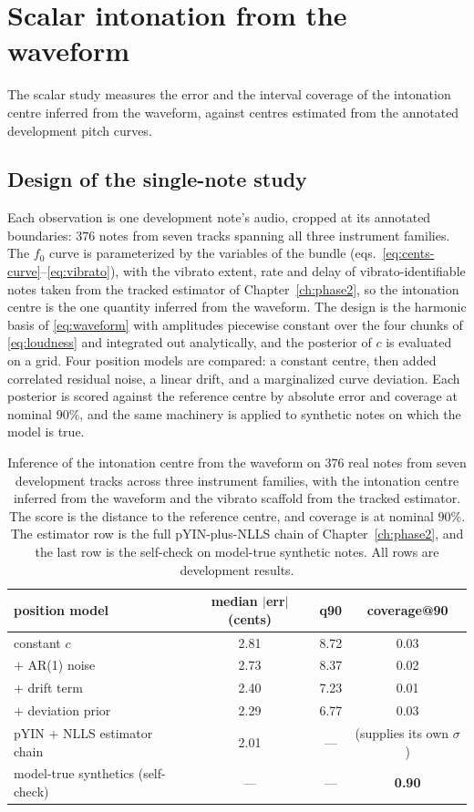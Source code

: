 \documentclass[11pt,a4paper]{report}
\begin{document}
\section{Scalar intonation from the waveform}
\label{sec:phase3-study}

The scalar study measures the error and the interval coverage of the
intonation centre inferred from the waveform, against centres estimated
from the annotated development pitch curves.

\subsection{Design of the single-note study}
Each observation is one development note's audio, cropped at its annotated
boundaries: $376$ notes from seven tracks spanning all three instrument
families. The $f_0$ curve is parameterized by the variables of the bundle
(eqs.~\eqref{eq:cents-curve}--\eqref{eq:vibrato}), with the vibrato
extent, rate and delay of vibrato-identifiable notes taken from the tracked
estimator of Chapter~\ref{ch:phase2}, so the intonation centre is the one
quantity inferred from the waveform. The design is the harmonic basis of
\eqref{eq:waveform} with amplitudes piecewise constant over the four chunks
of \eqref{eq:loudness} and integrated out analytically, and the posterior
of $c$ is evaluated on a grid. Four position models are compared: a
constant centre, then added correlated residual noise, a linear drift, and
a marginalized curve deviation. Each posterior is scored against the
reference centre by absolute error and coverage at nominal $90\%$, and the
same machinery is applied to synthetic notes on which the model is true.

\begin{table}[t]\centering
\caption{Inference of the intonation centre from the waveform on $376$ real
notes from seven development tracks across three instrument families, with
the intonation centre inferred from the waveform and the vibrato scaffold
from the tracked estimator. The score is the distance to the reference
centre, and coverage is at nominal $90\%$. The estimator row is the full
pYIN-plus-NLLS chain of Chapter~\ref{ch:phase2}, and the last row is the
self-check on model-true synthetic notes. All rows are development
results.}
\label{tab:phase3-study}
\footnotesize
\begin{tabular}{@{}lccc@{}}
\toprule
position model & median $|$err$|$ (cents) & q90 & coverage@90 \\
\midrule
constant $c$ & 2.81 & 8.72 & 0.03 \\
$+$ AR(1) noise & 2.73 & 8.37 & 0.02 \\
$+$ drift term & 2.40 & 7.23 & 0.01 \\
$+$ deviation prior & 2.29 & 6.77 & 0.03 \\
\midrule
pYIN $+$ NLLS estimator chain & 2.01 & --- & (supplies its own $\sigma$) \\
model-true synthetics (self-check) & --- & --- & \textbf{0.90} \\
\bottomrule
\end{tabular}
\end{table}
\end{document}
